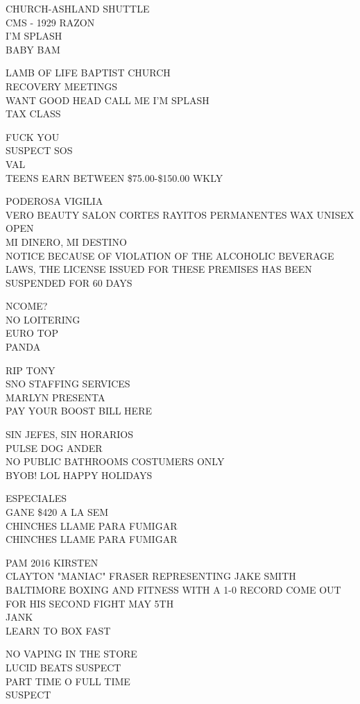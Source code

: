 \documentclass[10pt,letterpaper]{article}
\begin{document}
CHURCH{-}ASHLAND SHUTTLE\\
CMS {-} 1929 RAZON\\
I'M SPLASH\\
BABY BAM

LAMB OF LIFE BAPTIST CHURCH\\
RECOVERY MEETINGS\\
WANT GOOD HEAD CALL ME I'M SPLASH\\
TAX CLASS

FUCK YOU\\
SUSPECT SOS\\
VAL\\
TEENS EARN BETWEEN \$75.00{-}\$150.00 WKLY

PODEROSA VIGILIA\\
VERO BEAUTY SALON CORTES RAYITOS PERMANENTES WAX UNISEX OPEN\\
MI DINERO, MI DESTINO\\
NOTICE BECAUSE OF VIOLATION OF THE ALCOHOLIC BEVERAGE LAWS, THE LICENSE ISSUED FOR THESE PREMISES HAS BEEN SUSPENDED FOR 60 DAYS

NCOME?\\
NO LOITERING\\
EURO TOP\\
PANDA

RIP TONY\\
SNO STAFFING SERVICES\\
MARLYN PRESENTA\\
PAY YOUR BOOST BILL HERE

SIN JEFES, SIN HORARIOS\\
PULSE DOG ANDER\\
NO PUBLIC BATHROOMS COSTUMERS ONLY\\
BYOB! LOL HAPPY HOLIDAYS

ESPECIALES\\
GANE \$420 A LA SEM\\
CHINCHES LLAME PARA FUMIGAR\\
CHINCHES LLAME PARA FUMIGAR

PAM 2016 KIRSTEN\\
CLAYTON "MANIAC" FRASER REPRESENTING JAKE SMITH BALTIMORE BOXING AND FITNESS WITH A 1{-}0 RECORD COME OUT FOR HIS SECOND FIGHT MAY 5TH\\
JANK\\
LEARN TO BOX FAST

NO VAPING IN THE STORE\\
LUCID BEATS SUSPECT\\
PART TIME O FULL TIME\\
SUSPECT
\end{document}
